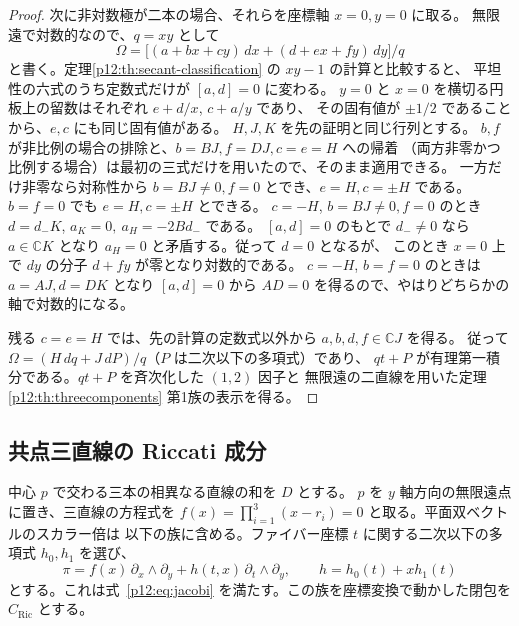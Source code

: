 \begin{proof}
次に非対数極が二本の場合、それらを座標軸 $x=0,y=0$ に取る。
無限遠で対数的なので、$q=xy$ として
\[
 \Omega=\big[(a+bx+cy)\,dx+(d+ex+fy)\,dy\big]/q
\]
と書く。定理\ref{p12:th:secant-classification} の $xy-1$ の計算と比較すると、
平坦性の六式のうち定数式だけが $[a,d]=0$ に変わる。
$y=0$ と $x=0$ を横切る円板上の留数はそれぞれ $e+d/x$, $c+a/y$ であり、
その固有値が $\pm1/2$ であることから、$e,c$ にも同じ固有値がある。
$H,J,K$ を先の証明と同じ行列とする。
$b,f$ が非比例の場合の排除と、$b= B J, f=D J, c=e=H$ への帰着
（両方非零かつ比例する場合）は最初の三式だけを用いたので、そのまま適用できる。
一方だけ非零なら対称性から $b=BJ\ne0,f=0$ とでき、$e=H,c=\pm H$ である。
$b=f=0$ でも $e=H,c=\pm H$ とできる。
$c=-H$, $b=BJ\ne0,f=0$ のとき $d=d_-K$,
$a_K=0,\ a_H=-2Bd_-$ である。
$[a,d]=0$ のもとで $d_-\ne0$ なら $a\in\mathbb CK$ となり
$a_H=0$ と矛盾する。従って $d=0$ となるが、
このとき $x=0$ 上で $dy$ の分子 $d+fy$ が零となり対数的である。
$c=-H$, $b=f=0$ のときは $a=AJ,d=DK$ となり $[a,d]=0$ から
$AD=0$ を得るので、やはりどちらかの軸で対数的になる。

残る $c=e=H$ では、先の計算の定数式以外から
$a,b,d,f\in\mathbb CJ$ を得る。
従って $\Omega=(H\,dq+J\,dP)/q$（$P$ は二次以下の多項式）であり、
$q t+P$ が有理第一積分である。$qt+P$ を斉次化した $(1,2)$ 因子と
無限遠の二直線を用いた定理\ref{p12:th:threecomponents} 第1族の表示を得る。
\end{proof}

\subsection{共点三直線の Riccati 成分}
中心 $p$ で交わる三本の相異なる直線の和を $D$ とする。
$p$ を $y$ 軸方向の無限遠点に置き、三直線の方程式を
$f(x)=\prod_{i=1}^3(x-r_i)=0$ と取る。平面双ベクトルのスカラー倍は
以下の族に含める。ファイバー座標 $t$ に関する二次以下の多項式
$h_0,h_1$ を選び、
\begin{equation}\label{p12:eq:concurrent-family}
 \pi= f(x)\,\partial_x\wedge\partial_y+
 h(t,x)\,\partial_t\wedge\partial_y,\qquad h=h_0(t)+x h_1(t)
\end{equation}
とする。これは式~\eqref{p12:eq:jacobi} を満たす。この族を座標変換で動かした閉包を
$C_{\mathrm{Ric}}$ とする。

